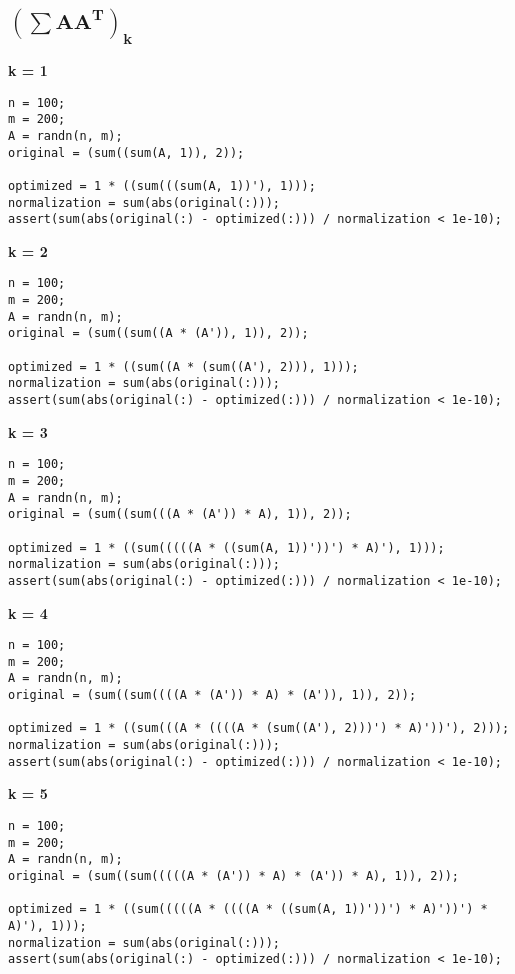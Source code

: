 

\subsection{$\mathbf{(\sum AA^T)_k}$}



{\bf k = 1}

\begin{lstlisting}
n = 100;
m = 200;
A = randn(n, m);
original = (sum((sum(A, 1)), 2));

optimized = 1 * ((sum(((sum(A, 1))'), 1)));
normalization = sum(abs(original(:)));
assert(sum(abs(original(:) - optimized(:))) / normalization < 1e-10);
\end{lstlisting}


{\bf k = 2}

\begin{lstlisting}
n = 100;
m = 200;
A = randn(n, m);
original = (sum((sum((A * (A')), 1)), 2));

optimized = 1 * ((sum((A * (sum((A'), 2))), 1)));
normalization = sum(abs(original(:)));
assert(sum(abs(original(:) - optimized(:))) / normalization < 1e-10);
\end{lstlisting}


{\bf k = 3}

\begin{lstlisting}
n = 100;
m = 200;
A = randn(n, m);
original = (sum((sum(((A * (A')) * A), 1)), 2));

optimized = 1 * ((sum(((((A * ((sum(A, 1))'))') * A)'), 1)));
normalization = sum(abs(original(:)));
assert(sum(abs(original(:) - optimized(:))) / normalization < 1e-10);
\end{lstlisting}


{\bf k = 4}

\begin{lstlisting}
n = 100;
m = 200;
A = randn(n, m);
original = (sum((sum((((A * (A')) * A) * (A')), 1)), 2));

optimized = 1 * ((sum(((A * ((((A * (sum((A'), 2)))') * A)'))'), 2)));
normalization = sum(abs(original(:)));
assert(sum(abs(original(:) - optimized(:))) / normalization < 1e-10);
\end{lstlisting}


{\bf k = 5}

\begin{lstlisting}
n = 100;
m = 200;
A = randn(n, m);
original = (sum((sum(((((A * (A')) * A) * (A')) * A), 1)), 2));

optimized = 1 * ((sum(((((A * ((((A * ((sum(A, 1))'))') * A)'))') * A)'), 1)));
normalization = sum(abs(original(:)));
assert(sum(abs(original(:) - optimized(:))) / normalization < 1e-10);
\end{lstlisting}


